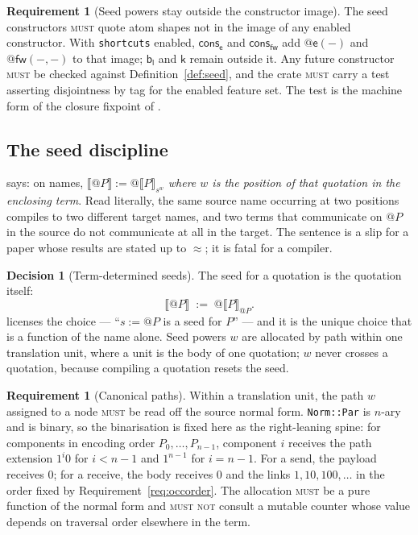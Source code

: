 \documentclass[11pt,a4paper]{article}
\makeatletter
\newcommand{\code}[1]{\texttt{#1}}
\newcommand{\MUST}{\textsc{must}}
\newcommand{\MUSTNOT}{\textsc{must not}}
\newcommand{\quo}[1]{@#1}
\newcommand{\enc}[1]{\llbracket #1 \rrbracket}
\newcommand{\bisim}{\approx}
\newcommand{\kk}{\mathsf{k}}
\newcommand{\fw}{\mathsf{fw}}
\newcommand{\bl}{\mathsf{b}_{\mathsf{l}}}
\newcommand{\ev}{\mathsf{e}}
\newcommand{\cons}{\mathsf{cons}}
\theoremstyle{definition}
\newtheorem{requirement}[definition]{Requirement}
\newtheorem{decision}[definition]{Decision}
\theoremstyle{plain}
\makeatother
\begin{document}
\begin{requirement}[Seed powers stay outside the constructor image]
\label{req:seedimage}
The seed constructors \MUST{} quote atom shapes not in the image of any
enabled constructor. With \code{shortcuts} enabled, $\cons_{\ev}$ and
$\cons_{\fw}$ add $\quo{\ev(-)}$ and $\quo{\fw(-,-)}$ to that image; $\bl$ and
$\kk$ remain outside it. Any future constructor \MUST{} be checked against
Definition~\ref{def:seed}, and the crate \MUST{} carry a test asserting
disjointness by tag for the enabled feature set. The test is the machine form
of the closure fixpoint of \cite[Prop.~8.2]{logic}.
\end{requirement}

\subsection{The seed discipline}

\cite[Def.~6.6]{draft3} says: on names, $\enc{\quo{P}} :=
\quo{\enc{P}_{s^{w}}}$ \emph{where $w$ is the position of that quotation in
the enclosing term}. Read literally, the same source name occurring at two
positions compiles to two different target names, and two terms that
communicate on $\quo{P}$ in the source do not communicate at all in the
target. The sentence is a slip for a paper whose results are stated up to
$\bisim$; it is fatal for a compiler.

\begin{decision}[Term-determined seeds]\label{dec:seed}
The seed for a quotation is the quotation itself:
\[
  \enc{\quo{P}} \;:=\; \quo{\enc{P}_{\quo{P}}}.
\]
\cite[Lem.~6.2]{draft3} licenses the choice --- ``$s := \quo{P}$ is a seed for
$P$'' --- and it is the unique choice that is a function of the name alone.
Seed powers $w$ are allocated by path within one translation unit, where a
unit is the body of one quotation; $w$ never crosses a quotation, because
compiling a quotation resets the seed.
\end{decision}

\begin{requirement}[Canonical paths]\label{req:paths}
Within a translation unit, the path $w$ assigned to a node \MUST{} be read off
the source normal form. \code{Norm::Par} is $n$-ary and
\cite[Def.~6.6]{draft3} is binary, so the binarisation is fixed here as the
right-leaning spine: for components in encoding order $P_{0},\dots,P_{n-1}$,
component $i$ receives the path extension $1^{i}0$ for $i < n-1$ and
$1^{n-1}$ for $i = n-1$. For a send, the payload receives $0$; for a receive,
the body receives $0$ and the links $1, 10, 100, \ldots$ in the order fixed by
Requirement~\ref{req:occorder}. The allocation \MUST{} be a pure function of
the normal form and \MUSTNOT{} consult a mutable counter whose value depends
on traversal order elsewhere in the term.
\end{requirement}
\end{document}
